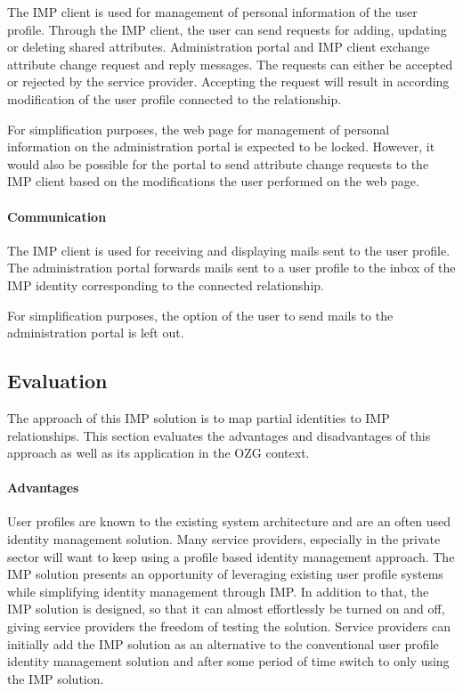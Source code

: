 The IMP client is used for management of personal information of the user profile. Through the IMP client, the user can send requests for adding, updating or deleting shared attributes. Administration portal and IMP client exchange attribute change request and reply messages. The requests can either be accepted or rejected by the service provider. Accepting the request will result in according modification of the user profile connected to the relationship.

For simplification purposes, the web page for management of personal information on the administration portal is expected to be locked. However, it would also be possible for the portal to send attribute change requests to the IMP client based on the modifications the user performed on the web page.

\paragraph{Communication}

The IMP client is used for receiving and displaying mails sent to the user profile. The administration portal forwards mails sent to a user profile to the inbox of the IMP identity corresponding to the connected relationship.

For simplification purposes, the option of the user to send mails to the administration portal is left out.

\subsection{Evaluation}

The approach of this IMP solution is to map partial identities to IMP relationships. This section evaluates the advantages and disadvantages of this approach as well as its application in the OZG context.

\paragraph{Advantages}

User profiles are known to the existing system architecture and are an often used identity management solution. Many service providers, especially in the private sector will want to keep using a profile based identity management approach. The IMP solution presents an opportunity of leveraging existing user profile systems while simplifying identity management through IMP. In addition to that, the IMP solution is designed, so that it can almost effortlessly be turned on and off, giving service providers the freedom of testing the solution. Service providers can initially add the IMP solution as an alternative to the conventional user profile identity management solution and after some period of time switch to only using the IMP solution.

